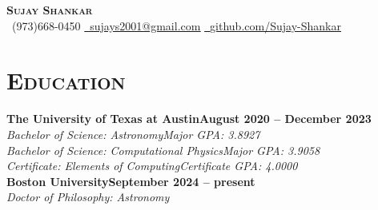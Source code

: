 \documentclass[11pt]{article}
\begin{document}
\begin{center}
    {\Huge \textbf{\textsc{Sujay Shankar}}} \\ \vspace{2pt}
    \faPhoneSquare~(973)668-0450 \hspace{5pt}
    \faEnvelopeSquare\href{mailto:sujays2001@gmail.com}{~\underline{sujays2001@gmail.com}} \hspace{5pt}
    \faGithubSquare\href{https://github.com/Sujay-Shankar}{~\underline{github.com/Sujay-Shankar}}
\end{center}

\section{\textsc{Education}}
\normalsize\textbf{The University of Texas at Austin}\hfill\small\textbf{August 2020 -- December 2023}
\\ \textit{Bachelor of Science: Astronomy\hfill Major GPA: 3.8927}
\\ \textit{Bachelor of Science: Computational Physics\hfill Major GPA: 3.9058}
\\ \textit{Certificate: Elements of Computing\hfill Certificate GPA: 4.0000} \vspace{5pt}
\\ \normalsize\textbf{Boston University}\hfill\small\textbf{September 2024 -- present}
\\ \textit{Doctor of Philosophy: Astronomy}
\end{document}
